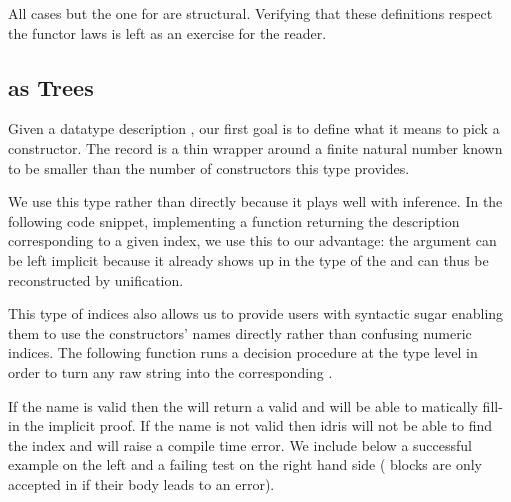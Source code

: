 All cases but the one for  are structural.
%
Verifying that these definitions respect the functor laws is left as
an exercise for the reader.

\subsection{ as Trees}

Given a datatype description , our first goal is
to define what it means to pick a constructor.
%
The  record is a thin wrapper around a finite
natural number known to be smaller than the number of constructors
this type provides.


We use this type rather than  directly because it
plays well with inference.
%
In the following code snippet, implementing a function returning
the description corresponding to a given index,
we use this to our advantage:
the  argument can be left implicit because it already
shows up in the type of the  and can thus be
reconstructed by unification.


This type of indices also allows us to provide users with
syntactic sugar enabling them to use the constructors' names
directly rather than confusing numeric indices.
%
The following function runs a decision procedure
 at the type level
in order to turn any raw string 
into the corresponding .


If the name is valid then the  will
return a valid  and \idris{} will be able to
matically fill-in the implicit proof.
%
If the name is not valid then idris will not be able to
find the index and will raise a compile time error.
%
We include below a successful example on the left and a failing test
on the right hand side ( blocks are only
accepted in \idris{} if their body leads to an error).

\begin{minipage}[t]{0.3\textwidth}
\end{minipage}\hfill
\begin{minipage}[t]{0.5\textwidth}
\end{minipage}

